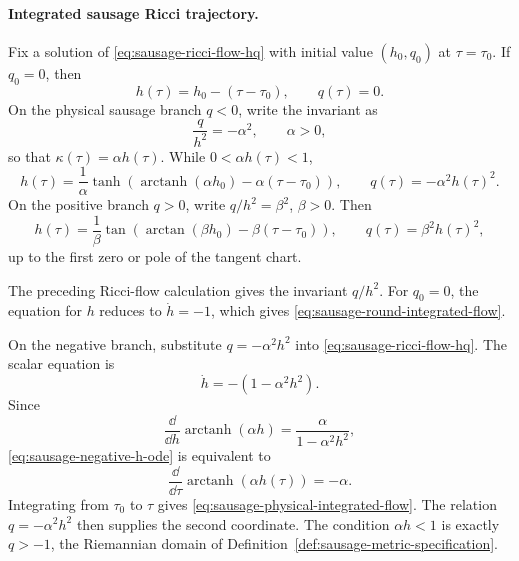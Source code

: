 \paragraph{Integrated sausage Ricci trajectory.}
Fix a solution of \eqref{eq:sausage-ricci-flow-hq} with initial value
\((h_0,q_0)\) at \(\tau=\tau_0\).  If \(q_0=0\), then
\begin{equation}
  h(\tau)=h_0-(\tau-\tau_0),\qquad q(\tau)=0 .
  \label{eq:sausage-round-integrated-flow}
\end{equation}
On the physical sausage branch \(q<0\), write the invariant as
\begin{equation}
  \frac{q}{h^2}=-\alpha^2,\qquad \alpha>0,
  \label{eq:sausage-alpha-invariant}
\end{equation}
so that \(\kappa(\tau)=\alpha h(\tau)\).  While \(0<\alpha h(\tau)<1\),
\begin{equation}
  h(\tau)
  =
  \frac1\alpha
  \tanh\!\left(
    \operatorname{arctanh}(\alpha h_0)-\alpha(\tau-\tau_0)
  \right),
  \qquad
  q(\tau)=-\alpha^2h(\tau)^2 .
  \label{eq:sausage-physical-integrated-flow}
\end{equation}
On the positive branch \(q>0\), write \(q/h^2=\beta^2\), \(\beta>0\).  Then
\begin{equation}
  h(\tau)
  =
  \frac1\beta
  \tan\!\left(
    \arctan(\beta h_0)-\beta(\tau-\tau_0)
  \right),
  \qquad
  q(\tau)=\beta^2h(\tau)^2 ,
  \label{eq:sausage-positive-integrated-flow}
\end{equation}
up to the first zero or pole of the tangent chart.

The preceding Ricci-flow calculation gives the invariant \(q/h^2\).  For
\(q_0=0\), the equation for \(h\) reduces to \(\dot h=-1\), which gives
\eqref{eq:sausage-round-integrated-flow}.

On the negative branch, substitute \(q=-\alpha^2h^2\) into
\eqref{eq:sausage-ricci-flow-hq}.  The scalar equation is
\begin{equation}
  \dot h=-(1-\alpha^2h^2).
  \label{eq:sausage-negative-h-ode}
\end{equation}
Since
\[
  \frac{\dd}{\dd h}\operatorname{arctanh}(\alpha h)
  =
  \frac{\alpha}{1-\alpha^2h^2},
\]
\eqref{eq:sausage-negative-h-ode} is equivalent to
\[
  \frac{\dd}{\dd\tau}\operatorname{arctanh}(\alpha h(\tau))=-\alpha .
\]
Integrating from \(\tau_0\) to \(\tau\) gives
\eqref{eq:sausage-physical-integrated-flow}.  The relation
\(q=-\alpha^2h^2\) then supplies the second coordinate.  The condition
\(\alpha h<1\) is exactly \(q>-1\), the Riemannian domain of
Definition~\ref{def:sausage-metric-specification}.

